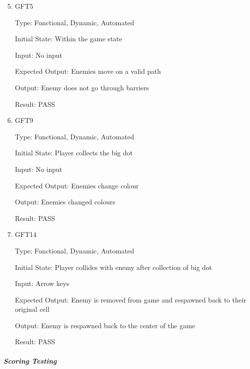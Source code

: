 \documentclass[12pt, titlepage]{article}
\begin{document}
\begin{enumerate}
\setcounter{enumi}{4}
\item{\label{gft5}{GFT5}\\}

Type: Functional, Dynamic, Automated
					
Initial State: Within the game state
					
Input: No input
					
Expected Output: Enemies move on a valid path

Output: Enemy does not go through barriers

Result: PASS
\setcounter{enumi}{8}
\item{\label{gft9}{GFT9}\\}

Type: Functional, Dynamic, Automated
					
Initial State: Player collects the big dot
					
Input: No input
					
Expected Output: Enemies change colour

Output: Enemies changed colours

Result: PASS
\setcounter{enumi}{13}
\item{\label{gft14}{GFT14}\\}

Type: Functional, Dynamic, Automated
					
Initial State: Player collides with enemy after collection of big dot
					
Input: Arrow keys
					
Expected Output: Enemy is removed from game and respawned back to their original cell

Output: Enemy is respawned back to the center of the game

Result: PASS

\end{enumerate}

\subparagraph{Scoring Testing}
\end{document}
